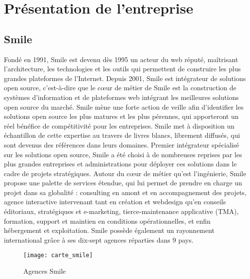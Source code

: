 
\chapter{Présentation de l'entreprise}

\section{Smile}

Fondé en 1991, Smile est devenu dès 1995 un acteur du web réputé, maîtrisant l’architecture,
les technologies et les outils qui permettent de construire les plus grandes plateformes de
l’Internet.
Depuis 2001, Smile est intégrateur de solutions open source, c'est-à-dire que le cœur de
métier de Smile est la construction de systèmes d’information et de plateformes web
intégrant les meilleures solutions open source du marché.
Smile mène une forte action de veille afin d’identifier les solutions open source les plus
matures et les plus pérennes, qui apporteront un réel bénéfice de compétitivité pour les
entreprises. Smile met à disposition un échantillon de cette expertise au travers de livres
blancs, librement diffusés, qui sont devenus des références dans leurs domaines.
Premier intégrateur spécialisé sur les solutions open source, Smile a été choisi à de
nombreuses reprises par les plus grandes entreprises et administrations pour déployer ces
solutions dans le cadre de projets stratégiques.
Autour du cœur de métier qu’est l’ingénierie, Smile propose une palette de services étendue,
qui lui permet de prendre en charge un projet dans sa globalité : consulting en amont et en
accompagnement des projets, agence interactive intervenant tant en création et
webdesign qu’en conseils éditoriaux, stratégiques et e-marketing, tierce-maintenance
applicative (TMA), formation, support et maintien en conditions opérationnelles, et enfin
hébergement et exploitation.
Smile possède également un rayonnement international grâce à ses dix-sept agences
réparties dans 9 pays.

\begin{figure}[!h]
  \texttt{[image: carte\_smile]}
  \caption{\label{smile_map} Agences Smile}
\end{figure}

